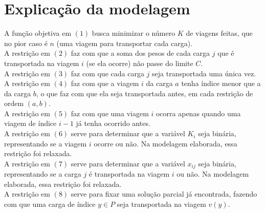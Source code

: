 \documentclass{article}
\begin{document}
\section{Explicação da modelagem}
A função objetiva em $(1)$ busca minimizar o número $K$ de viagens feitas, que no pior caso é $n$ (uma viagem para transportar cada carga).\\
A restrição em $(2)$ faz com que a soma dos pesos de cada carga $j$ que é transportada na viagem $i$ (se ela ocorre) não passe do limite $C$.\\
A restrição em $(3)$ faz com que cada carga $j$ seja transportada uma única vez.\\
A restrição em $(4)$ faz com que a viagem $i$ da carga $a$ tenha índice menor que a da carga $b$, o que faz com que ela seja transportada antes, em cada restrição de ordem $(a, b)$.\\
A restrição em $(5)$ faz com que uma viagem $i$ ocorra apenas quando uma viagem de índice $i-1$ já tenha ocorrido antes.\\
A restrição em $(6)$ serve para determinar que a variável $K_i$ seja binária, representando se a viagem $i$ ocorre ou não. Na modelagem elaborada, essa restrição foi relaxada.\\
A restrição em $(7)$ serve para determinar que a variável $x_{ij}$ seja binária, representando se a carga $j$ é transportada na viagem $i$ ou não. Na modelagem elaborada, essa restrição foi relaxada.\\
A restrição em $(8)$ serve para fixar uma solução parcial já encontrada, fazendo com que uma carga de índice $y \in P$ seja transportada na viagem $v(y)$.

\newpage
\end{document}
